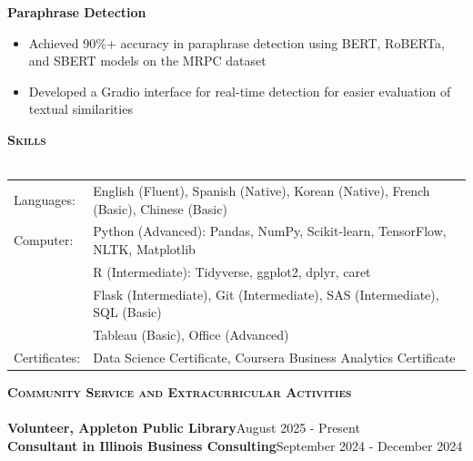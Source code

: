 \documentclass[a4paper]{article}
\newcommand{\lineunder} {
    \vspace*{-8pt} \\
    \hspace*{-18pt} \hrulefill \\
}
\newcommand{\header} [1] {
    {\hspace*{-18pt}\vspace*{6pt} \textsc{#1}}
    \vspace*{-6pt} \lineunder
}
\begin{document}
\textbf{Paraphrase Detection}
\begin{itemize}[nolistsep]
    \item Achieved 90\%+ accuracy in paraphrase detection using BERT, RoBERTa,
     and SBERT models on the MRPC dataset
    \item Developed a Gradio interface for real-time detection for easier evaluation 
    of textual similarities
\end{itemize}

\vspace*{1mm}

\header{\textbf{Skills}}
\begin{tabular}{ l l }
    Languages: & English (Fluent), Spanish (Native), Korean (Native), French (Basic), Chinese (Basic) \\
    Computer: & Python (Advanced): Pandas, NumPy, Scikit-learn, TensorFlow, NLTK, Matplotlib \\
    & R (Intermediate): Tidyverse, ggplot2, dplyr, caret \\
    & Flask (Intermediate), Git (Intermediate), SAS (Intermediate), SQL (Basic) \\
    & Tableau (Basic), Office (Advanced) \\
    Certificates: & Data Science Certificate, Coursera Business Analytics Certificate
\end{tabular}

\vspace{1mm}

\header{\textbf{Community Service and Extracurricular Activities}}

\textbf{Volunteer, Appleton Public Library}\hfill August 2025 - Present\\

\textbf{Consultant in Illinois Business Consulting}\hfill September 2024 - December 2024\\
\end{document}
